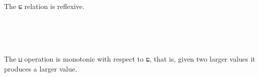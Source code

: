 The \texttt{⊑} relation is reflexive.

\begin{fence}
\begin{code}%
\>[0]\AgdaSpace{}%
\AgdaSymbol{:}\AgdaSpace{}%
\AgdaSpace{}%
\AgdaSymbol{\{}\AgdaSymbol{\}}\AgdaSpace{}%
\AgdaSpace{}%
\AgdaSpace{}%
\AgdaSpace{}%
\<%
\\
\>[0]\AgdaSpace{}%
\AgdaSymbol{\{}\AgdaSymbol{\}}\AgdaSpace{}%
\AgdaSymbol{=}\AgdaSpace{}%
\<%
\\
\>[0]\AgdaSpace{}%
\AgdaSymbol{\{}\AgdaSpace{}%
\AgdaSpace{}%
\AgdaSymbol{\}}\AgdaSpace{}%
\AgdaSymbol{=}\AgdaSpace{}%
\AgdaSpace{}%
\AgdaSpace{}%
\<%
\\
\>[0]\AgdaSpace{}%
\AgdaSymbol{\{}\AgdaSpace{}%
\AgdaSpace{}%
\AgdaSymbol{\}}\AgdaSpace{}%
\AgdaSymbol{=}\AgdaSpace{}%
\AgdaSpace{}%
\AgdaSymbol{(}\AgdaSpace{}%
\AgdaSymbol{)}\AgdaSpace{}%
\AgdaSymbol{(}\AgdaSpace{}%
\AgdaSymbol{)}\<%
\end{code}
\end{fence}

The \texttt{⊔} operation is monotonic with respect to \texttt{⊑}, that
is, given two larger values it produces a larger value.

